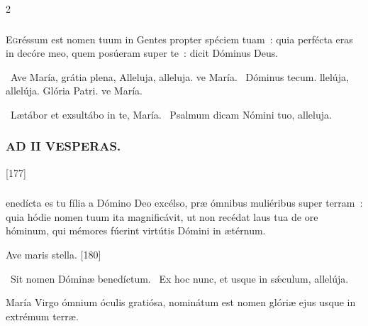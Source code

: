 \documentclass[9pt,twoside]{extarticle}
\begin{document}
\begin{multicols}{2}
{\subsubsection*{}
\lettrine{E}gréssum est nomen tuum in Gentes propter spéciem tuam~: quia perfécta eras in decóre meo, quem posúeram super te~: dicit Dóminus Deus.

\begin{tightlist}{}
\item {}~Ave María, grátia plena, \textred{*} Alleluja, alleluja. ve María. ~Dóminus tecum. llelúja, allelúja. Glória Patri. ve María.
\item {}~Lætábor et exsultábo in te, María. ~Psalmum dicam Nómini tuo, alleluja.
\end{tightlist}

\subsubsection*{\center \textsc{AD II VESPERAS.}}
\begin{tightlist}{}
\item {}
\item {} [177]
\end{tightlist}

\subsubsection*{}
enedícta es tu fília a Dómino Deo excélso, præ ómnibus muliéribus super terram~: quia hódie nomen tuum ita magnificávit, ut non recédat laus tua de ore hóminum, qui mémores fúerint virtútis Dómini in ætérnum.

\begin{tightlist}{}
\item {} Ave maris stella. [180]
\item {}~Sit nomen Dóminæ benedíctum. ~Ex hoc nunc, et usque in sǽculum, allelúja.
\item {} María Virgo ómnium óculis gratiósa, nominátum est nomen glóriæ ejus usque in extrémum terræ.
\end{tightlist}

}
\end{multicols}
\end{document}
